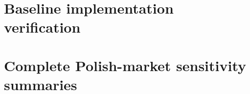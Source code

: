 \documentclass[11pt]{article}
\theoremstyle{plain}
\theoremstyle{definition}\newtheorem{remark}{Remark}\newtheorem{example}{Example}
\begin{document}

\section{Baseline implementation verification}\label{sec:baseline-verification}



\section{Complete Polish-market sensitivity summaries}\label{sec:complete-gpw}


\FloatBarrier


\end{document}
